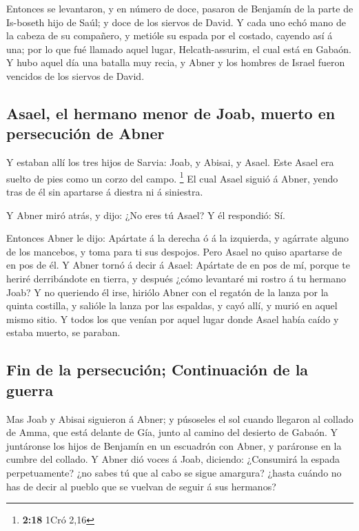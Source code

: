  Entonces se levantaron, y en número de doce, pasaron de
Benjamín de la parte de Is-boseth hijo de Saúl; y doce de los siervos de
David.  Y cada uno echó mano de la cabeza de su
compañero, y metióle su espada por el costado, cayendo así á una; por lo
que fué llamado aquel lugar, Helcath-assurim, el cual está en Gabaón.
 Y hubo aquel día una batalla muy recia, y Abner y los
hombres de Israel fueron vencidos de los siervos de David.

\hypertarget{asael-el-hermano-menor-de-joab-muerto-en-persecuciuxf3n-de-abner}{%
\subsection{Asael, el hermano menor de Joab, muerto en persecución de
Abner}\label{asael-el-hermano-menor-de-joab-muerto-en-persecuciuxf3n-de-abner}}

 Y estaban allí los tres hijos de Sarvia: Joab, y Abisai,
y Asael. Este Asael era suelto de pies como un corzo del campo.
\footnote{\textbf{2:18} 1Cró 2,16}  El cual Asael siguió
á Abner, yendo tras de él sin apartarse á diestra ni á siniestra.

 Y Abner miró atrás, y dijo: ¿No eres tú Asael? Y él
respondió: Sí.

 Entonces Abner le dijo: Apártate á la derecha ó á la
izquierda, y agárrate alguno de los mancebos, y toma para ti sus
despojos. Pero Asael no quiso apartarse de en pos de él. 
Y Abner tornó á decir á Asael: Apártate de en pos de mí, porque te
heriré derribándote en tierra, y después ¿cómo levantaré mi rostro á tu
hermano Joab?  Y no queriendo él irse, hiriólo Abner con
el regatón de la lanza por la quinta costilla, y salióle la lanza por
las espaldas, y cayó allí, y murió en aquel mismo sitio. Y todos los que
venían por aquel lugar donde Asael había caído y estaba muerto, se
paraban.

\hypertarget{fin-de-la-persecuciuxf3n-continuaciuxf3n-de-la-guerra}{%
\subsection{Fin de la persecución; Continuación de la
guerra}\label{fin-de-la-persecuciuxf3n-continuaciuxf3n-de-la-guerra}}

 Mas Joab y Abisai siguieron á Abner; y púsoseles el sol
cuando llegaron al collado de Amma, que está delante de Gía, junto al
camino del desierto de Gabaón.  Y juntáronse los hijos de
Benjamín en un escuadrón con Abner, y paráronse en la cumbre del
collado.  Y Abner dió voces á Joab, diciendo: ¿Consumirá
la espada perpetuamente? ¿no sabes tú que al cabo se sigue amargura?
¿hasta cuándo no has de decir al pueblo que se vuelvan de seguir á sus
hermanos?

